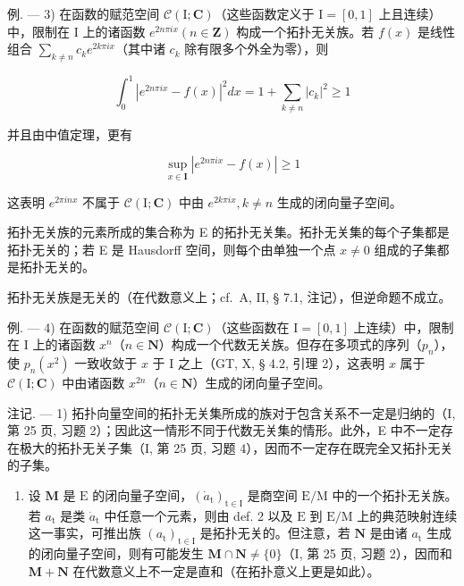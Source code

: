 例. --- 3) 在函数的赋范空间 \(\mathcal{C}(\mathrm{I};\mathbf{C})\)（这些函数定义于 \(\mathrm{I} = [0,1]\) 上且连续）中，限制在 \(\mathrm{I}\) 上的诸函数 \(e^{2n\pi ix}(n\in \mathbf{Z})\) 构成一个拓扑无关族。若 \(f(x)\) 是线性组合 \(\sum_{k\neq n}c_k e^{2k\pi ix}\)（其中诸 \(c_k\) 除有限多个外全为零），则

\[
\int_ {0} ^ {1} \left| e ^ {2 n \pi i x} - f (x) \right| ^ {2} d x = 1 + \sum_ {k \neq n} | c _ {k} | ^ {2} \geqslant 1
\]

并且由中值定理，更有

\[
\sup _ {x \in \mathbf {I}} \left| e ^ {2 n \pi i x} - f (x) \right| \geqslant 1
\]

这表明 \(e^{2\pi inx}\) 不属于 \(\mathcal{C}(\mathrm{I};\mathbf{C})\) 中由 \(e^{2k\pi ix}, k \neq n\) 生成的闭向量子空间。

拓扑无关族的元素所成的集合称为 E 的拓扑无关集。拓扑无关集的每个子集都是拓扑无关的；若 E 是 Hausdorff 空间，则每个由单独一个点 \(x \neq 0\) 组成的子集都是拓扑无关的。

拓扑无关族是无关的（在代数意义上；cf.~A, II, § 7.1, 注记），但逆命题不成立。

例. --- 4) 在函数的赋范空间 \(\mathcal{C}(\mathrm{I};\mathbf{C})\)（这些函数在 \(\mathrm{I} = [0,1]\) 上连续）中，限制在 \(\mathrm{I}\) 上的诸函数 \(x^n\)（\(n\in \mathbf{N}\)）构成一个代数无关族。但存在多项式的序列（\(p_n\)），使 \(p_n(x^2)\) 一致收敛于 \(x\) 于 \(\mathrm{I}\) 之上（GT, X, § 4.2, 引理 2），这表明 \(x\) 属于 \(\mathcal{C}(\mathrm{I};\mathbf{C})\) 中由诸函数 \(x^{2n}\)（\(n\in \mathbf{N}\)）生成的闭向量子空间。

注记. --- 1) 拓扑向量空间的拓扑无关集所成的族对于包含关系不一定是归纳的（I, 第 25 页, 习题 2）；因此这一情形不同于代数无关集的情形。此外，E 中不一定存在极大的拓扑无关子集（I, 第 25 页, 习题 4），因而不一定存在既完全又拓扑无关的子集。

\begin{enumerate}
\def\labelenumi{\arabic{enumi})}
\setcounter{enumi}{1}
\tightlist
\item
  设 \(\mathbf{M}\) 是 \(\mathrm{E}\) 的闭向量子空间，\((\dot{a}_{\mathrm{t}})_{\mathrm{t}\in \mathrm{I}}\) 是商空间 \(\mathrm{E / M}\) 中的一个拓扑无关族。若 \(a_{\mathrm{t}}\) 是类 \(\dot{a}_{\mathrm{t}}\) 中任意一个元素，则由 def. 2 以及 \(\mathrm{E}\) 到 \(\mathrm{E / M}\) 上的典范映射连续这一事实，可推出族 \((a_{\mathrm{t}})_{\mathrm{t}\in \mathrm{I}}\) 是拓扑无关的。但注意，若 \(\mathbf{N}\) 是由诸 \(a_{\mathrm{t}}\) 生成的闭向量子空间，则有可能发生 \(\mathbf{M} \cap \mathbf{N} \neq \{0\}\)（I, 第 25 页, 习题 2），因而和 \(\mathbf{M} + \mathbf{N}\) 在代数意义上不一定是直和（在拓扑意义上更是如此）。
\end{enumerate}

